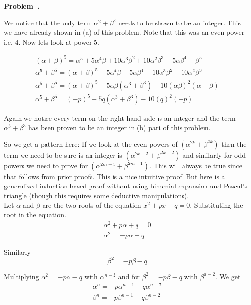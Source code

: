 \documentclass[10pt]{article}
\newcounter{problem}
\newenvironment{problem}[1][]{
  \refstepcounter{problem}
  \par\noindent\textbf{Problem~\theproblem. #1}\par
  \vspace{0.5em}
}{\vspace{1em}}
\begin{document}
\begin{problem}
  We notice that the only term $\alpha^2 + \beta^2$ needs to be shown to be an integer. This we have already shown in (a) of this problem.
  Note that this was an even power i.e. 4. Now lets look at power 5.

  \begin{gather*}
    (\alpha + \beta)^5 = \alpha^5 +  5\alpha^4\beta + 10\alpha^3\beta^2 + 10\alpha^2\beta^3 + 5\alpha\beta^4 + \beta^5\\
    \alpha^5 + \beta^5 = (\alpha + \beta)^5 - 5\alpha^4\beta - 5\alpha\beta^4 - 10\alpha^3\beta^2 - 10\alpha^2\beta^3\\
    \alpha^5 + \beta^5 = (\alpha + \beta)^5 - 5\alpha\beta(\alpha^3 + \beta^3) - 10(\alpha\beta)^2 (\alpha + \beta)\\
    \alpha^5 + \beta^5 = (-p)^5 - 5q(\alpha^3 + \beta^3) - 10(q)^2 (-p)
  \end{gather*}

  Again we notice every term on the right hand side is an integer and the term $\alpha^3 + \beta^3$ has been proven to be an integer in (b) part of this problem.

  So we get a pattern here: If we look at the even powers of $(\alpha^{2k} + \beta^{2k})$ then the term we need to be sure is an integer is 
  $(\alpha^{2k - 2} + \beta^{2k - 2})$ and similarly for odd powers we need to prove for $(\alpha^{2m - 1} + \beta^{2m -1})$. This will always be 
  true since that follows from prior proofs. This is a nice intuitive proof. But here is a generalized induction based proof without using binomial expansion and Pascal's triangle (though this requires some deductive manipulations).\\
 
  Let $\alpha$ and $\beta$ are the two roots of the equation $x^2 + px + q = 0$. Substituting the root in the equation.
  \begin{gather*}
    \alpha^2 + p\alpha + q = 0\\
    \alpha^2 = -p\alpha - q
  \end{gather*}

  Similarly 
  \[
  \beta^2 = -p\beta - q
  \]

  Multiplying $\alpha^2 = -p\alpha - q$ with $\alpha^{n - 2}$ and for $\beta^2 = -p\beta - q$ with $\beta^{n - 2}$. We get
  \begin{gather*}
    \alpha^n = -p\alpha^{n - 1} - q\alpha^{n - 2}\\
    \beta^n = -p\beta^{n - 1} - q\beta^{n - 2}
  \end{gather*}


\end{problem}
\end{document}
